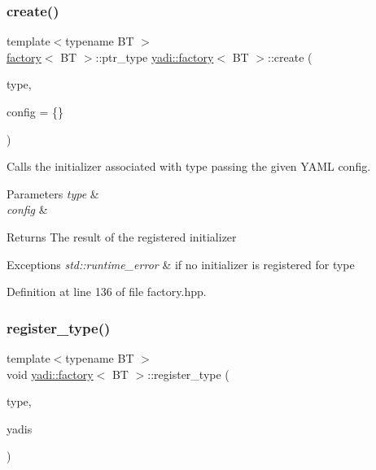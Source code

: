 \subsubsection{\texorpdfstring{create()}{create()}}
{\footnotesize\ttfamily template$<$typename BT $>$ \\
\hyperlink{structyadi_1_1factory}{factory}$<$ BT $>$\+::ptr\+\_\+type \hyperlink{structyadi_1_1factory}{yadi\+::factory}$<$ BT $>$\+::create (\begin{DoxyParamCaption}\item[{std\+::string const \&}]{type,  }\item[{Y\+A\+M\+L\+::\+Node const \&}]{config = {\ttfamily \{\}} }\end{DoxyParamCaption})\hspace{0.3cm}{\ttfamily [static]}}



Calls the initializer associated with type passing the given Y\+A\+ML config. 


\begin{DoxyParams}{Parameters}
{\em type} & \\
\hline
{\em config} & \\
\hline
\end{DoxyParams}
\begin{DoxyReturn}{Returns}
The result of the registered initializer 
\end{DoxyReturn}

\begin{DoxyExceptions}{Exceptions}
{\em std\+::runtime\+\_\+error} & if no initializer is registered for type \\
\hline
\end{DoxyExceptions}


Definition at line 136 of file factory.\+hpp.

\mbox{\label{structyadi_1_1factory_a512c17ea9ca1bde8dec81c22b08e5278}} 
\subsubsection{\texorpdfstring{register\+\_\+type()}{register\_type()}}
{\footnotesize\ttfamily template$<$typename BT $>$ \\
void \hyperlink{structyadi_1_1factory}{yadi\+::factory}$<$ BT $>$\+::register\+\_\+type (\begin{DoxyParamCaption}\item[{std\+::string}]{type,  }\item[{\hyperlink{structyadi_1_1factory_1_1yadi__info}{yadi\+\_\+info}}]{yadis }\end{DoxyParamCaption})\hspace{0.3cm}{\ttfamily [static]}}



